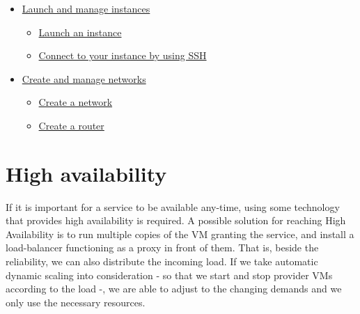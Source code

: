 \documentclass[a4paper]{article}
\begin{document}
\begin{itemize}
\begin{itemize}
{                        a key pair}
              \item
                    \href{https://docs.openstack.org/horizon/pike/user/configure-access-and-security-for-instances.html#import-a-key-pair}{
                        Import a key pair}
              \item
                    \href{https://docs.openstack.org/horizon/pike/user/configure-access-and-security-for-instances.html#allocate-a-floating-ip-address-to-an-instance}{Allocate a floating IP address to an instance}
          \end{itemize}
    \item \href{https://docs.openstack.org/horizon/pike/user/launch-instances.html}{Launch and manage instances}
          \begin{itemize}
              \item \href{https://docs.openstack.org/horizon/pike/user/launch-instances.html#launch-an-instance}{Launch an instance}
              \item
                    \href{https://docs.openstack.org/horizon/pike/user/launch-instances.html#connect-to-your-instance-by-using-ssh}{Connect
                        to your instance by using SSH}
          \end{itemize}
    \item \href{https://docs.openstack.org/horizon/pike/user/create-networks.html}{Create and manage networks}
          \begin{itemize}
              \item \href{https://docs.openstack.org/horizon/pike/user/create-networks.html#create-a-network}{Create a network}
              \item \href{https://docs.openstack.org/horizon/pike/user/create-networks.html#create-a-router}{Create a router}
          \end{itemize}
\end{itemize}

\section{High availability}

If it is important for a service to be available any-time, using some technology that provides high availability is
required. A possible solution for reaching High Availability is to run multiple copies of the VM granting
the service, and install a load-balancer functioning as a proxy in front of them. That is, beside the reliability, we can
also distribute the incoming load. If we take automatic dynamic scaling into consideration - so that we start and stop
provider VMs according to the load -, we are able to adjust to the changing demands and we only use the
necessary resources.
\end{document}

